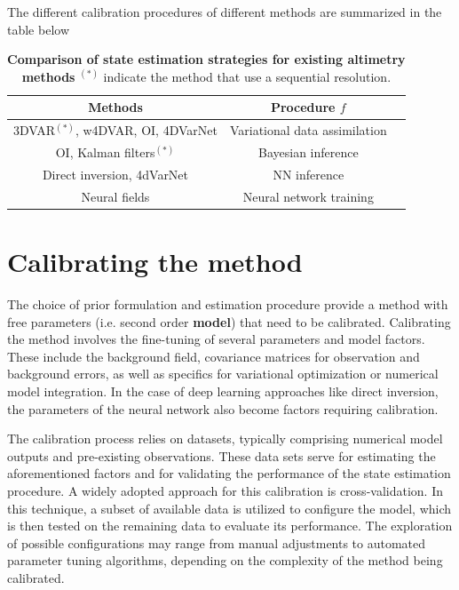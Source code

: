 \begin{bibunit}
The different calibration procedures of different methods are summarized in the table below 

\begin{table}
  \centering
  \begin{tabular}{|c|c|c|}
\hline
    Methods & Procedure $f$ \\
\hline
    3DVAR$^{(*)}$, w4DVAR, OI, 4DVarNet & Variational data assimilation \\
    OI, Kalman filters$^{(*)}$ & Bayesian inference \\
    Direct inversion, 4dVarNet & NN inference \\
    Neural fields & Neural network training \\
\hline
\end{tabular}
\caption{\textbf{Comparison of state estimation strategies for existing altimetry methods} $^{(*)}$ indicate the method that use a sequential resolution.}
\end{table}

%




\section{Calibrating the method}
The choice of prior formulation and estimation procedure provide a method with free parameters (i.e. second order \textbf{model}) that need to be calibrated. 
Calibrating the method involves the fine-tuning of several parameters and model factors. These include the background field, covariance matrices for observation and background errors, as well as specifics for variational optimization or numerical model integration. In the case of deep learning approaches like direct inversion, the parameters of the neural network also become factors requiring calibration.


The calibration process relies on datasets, typically comprising numerical model outputs and pre-existing observations. These data sets serve for estimating the aforementioned factors and for validating the performance of the state estimation procedure.
A widely adopted approach for this calibration is cross-validation. In this technique, a subset of available data is utilized to configure the model, which is then tested on the remaining data to evaluate its performance. The exploration of possible configurations may range from manual adjustments to automated parameter tuning algorithms, depending on the complexity of the method being calibrated.


\end{bibunit}
